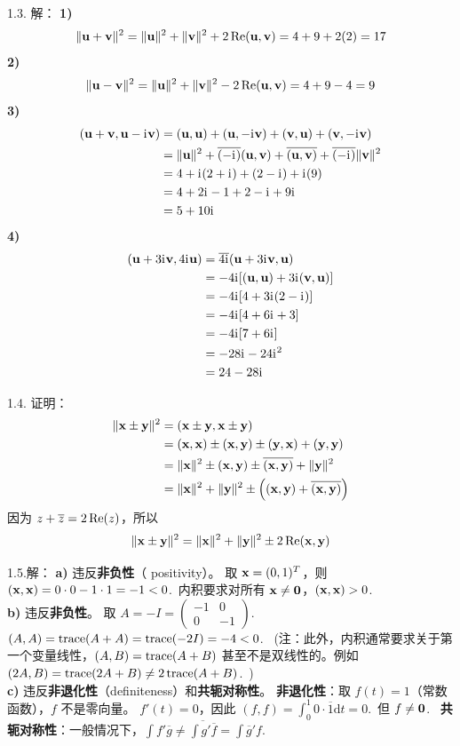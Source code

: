 \begin{exer}
1.3. 解：
\textbf{1)}
$$ \|\uu + \vv\|^2 = \|\uu\|^2 + \|\vv\|^2 + 2\ReR(\uu, \vv) = 4 + 9 + 2(2) = 17 $$
\textbf{2)}
$$ \|\uu - \vv\|^2 = \|\uu\|^2 + \|\vv\|^2 - 2\ReR(\uu, \vv) = 4 + 9 - 4 = 9 $$
\textbf{3)}
$$
\begin{aligned}
(\uu + \vv, \uu - \ii \vv) &= (\uu, \uu) + (\uu, -\ii \vv) + (\vv, \uu) + (\vv, -\ii \vv) \\
&= \|\uu\|^2 + \overline{(-\ii)}(\uu, \vv) + \overline{(\uu, \vv)} + \overline{(-\ii)}\|\vv\|^2 \\
&= 4 + \ii(2 + \ii) + (2 - \ii) + \ii(9) \\
&= 4 + 2\ii - 1 + 2 - \ii + 9\ii \\
&= 5 + 10\ii
\end{aligned}
$$
\textbf{4)}
$$
\begin{aligned}
(\uu + 3\ii \vv, 4\ii \uu) &= \overline{4\ii} (\uu + 3\ii \vv, \uu) \\
&= -4\ii [ (\uu, \uu) + 3\ii (\vv, \uu) ] \\
&= -4\ii [ 4 + 3\ii (2 - \ii) ] \\
&= -4\ii [ 4 + 6\ii + 3 ] \\
&= -4\ii [ 7 + 6\ii ] \\
&= -28\ii - 24\ii^2 \\
&= 24 - 28\ii
\end{aligned}
$$

1.4. 证明：
$$
\begin{aligned}
\|\xx \pm \yy\|^2 &= (\xx \pm \yy, \xx \pm \yy) \\
&= (\xx, \xx) \pm (\xx, \yy) \pm (\yy, \xx) + (\yy, \yy) \\
&= \|\xx\|^2 \pm (\xx, \yy) \pm \overline{(\xx, \yy)} + \|\yy\|^2 \\
&= \|\xx\|^2 + \|\yy\|^2 \pm \left( (\xx, \yy) + \overline{(\xx, \yy)} \right)
\end{aligned}
$$
因为 $z + \overline{z} = 2\ReR(z)$，所以
$$ \|\xx \pm \yy\|^2 = \|\xx\|^2 + \|\yy\|^2 \pm 2\ReR(\xx, \yy) $$

1.5.解：
\textbf{a)} 违反\textbf{非负性}（ positivity）。
取 $\xx = (0, 1)^T$，则 $(\xx, \xx) = 0\cdot 0 - 1\cdot 1 = -1 < 0$.~内积要求对所有 $\xx \neq \oo$，$(\xx, \xx) > 0$.~
\\
\textbf{b)} 违反\textbf{非负性}。
取 $A = -I = \begin{pmatrix} -1 & 0 \\ 0 & -1 \end{pmatrix}$.~
$(A, A) = \trace(A + A) = \trace(-2I) = -4 < 0$.~
(注：此外，内积通常要求关于第一个变量线性，$(A, B) = \trace(A+B)$ 甚至不是双线性的。例如 $(2A, B) = \trace(2A+B) \neq 2\trace(A+B)$.~)
\\
\textbf{c)} 违反\textbf{非退化性}（definiteness）和\textbf{共轭对称性}。
\textbf{非退化性}：取 $f(t) = 1$（常数函数），$f$ 不是零向量。
$f'(t) = 0$，因此 $(f, f) = \int_0^1 0 \cdot \overline{1} \mathrm{d}t = 0$.~但 $f \neq \oo$.~
\textbf{共轭对称性}：一般情况下，$\int f' \overline{g} \neq \overline{\int g' \overline{f}} = \int \overline{g}' f$.~


\end{exer}
